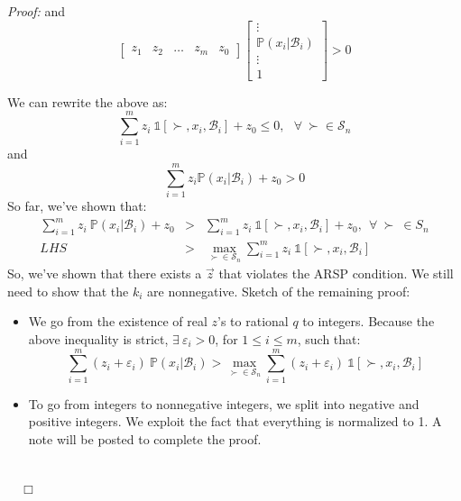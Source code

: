 \documentclass[11pt]{article}
\newcommand{\B}{\mathcal{B}}
\renewcommand{\S}{\mathcal{S}}
\newenvironment{proof}{\noindent\emph{Proof:}}{$\quad \Box$}
\begin{document}
\begin{proof}
and 
$$ 
\begin{bmatrix}
z_1 & z_2 & \ldots & z_m & z_0
\end{bmatrix}
\begin{bmatrix}
\vdots \\
\mathbb{P}(x_i|\B_i) \\
\vdots \\
\hline
1
\end{bmatrix} 
> 0$$


We can rewrite the above as: 
$$\sum^m_{i=1} z_i ~\mathds{1} [\succ, x_i, \B_i] + z_0 \leq 0, ~~~\forall~\succ \in \S_n$$
and 
$$\sum^m_{i=1} z_i \mathbb{P}(x_i | \B_i) + z_0 > 0 $$
So far, we've shown that:
\begin{eqnarray*}
\sum^m_{i=1} z_i ~\mathbb{P}(x_i | \B_i) + z_0 &>& \sum^m_{i=1} z_i ~\mathds{1}[\succ, x_i, \B_i] + z_0,~~\forall~\succ~ \in S_n \\
LHS &>& \max_{\succ \in \S_n} \sum^m_{i=1} z_i ~\mathds{1} [\succ, x_i, \B_i]
\end{eqnarray*}
So, we've shown that there exists a $\vec{z}$ that violates the ARSP condition. We still need to show that the $k_i$ are nonnegative. Sketch of the remaining proof:
\begin{itemize}
	\item We go from the existence of real $z$'s to rational $q$ to integers. Because the above inequality is strict, $\exists~\varepsilon_i>0$, for $1 \leq i \leq m$, such that:
	$$\sum^m_{i=1}(z_i+\varepsilon_i) ~\mathbb{P}(x_i | \B_i) > \max_{\succ \in \S_n} \sum^m_{i=1} (z_i + \varepsilon_i) ~\mathds{1}[\succ, x_i, \B_i]$$
	\item To go from integers to nonnegative integers, we split into negative and positive integers. We exploit the fact that everything is normalized to 1. A note will be posted to complete the proof.
\end{itemize}
\begin{eqnarray*}\end{eqnarray*}

\end{proof}
\end{document}
